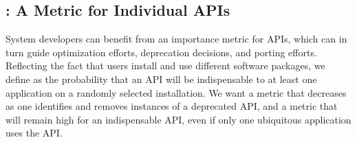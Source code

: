 \subsection{\UsageMetric{}: A Metric for Individual APIs}

System developers can benefit from an importance metric for APIs,
which can in turn guide optimization efforts, deprecation decisions,
and porting efforts.  
Reflecting the fact that users install and use different software packages,
we define
\usagemetric{} as the probability that
an API will be indispensable to 
 at least one application on a randomly selected 
installation.
We want a metric that decreases
as one identifies and removes instances
of a deprecated API,
and a metric that will remain high for an indispensable API, 
even if only one ubiquitous application uses the API.






